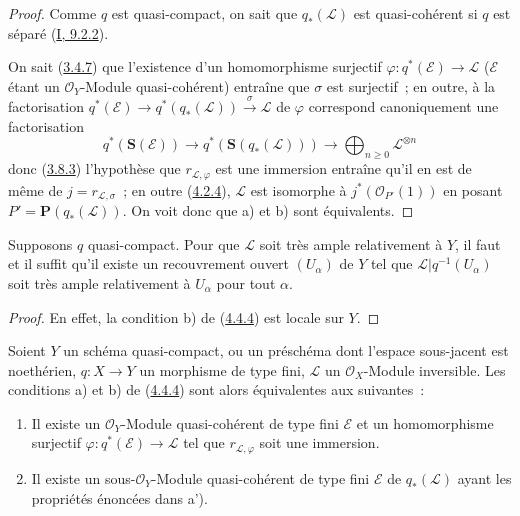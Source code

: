 \begin{proof}
Comme $q$ est quasi-compact, on sait que $q_*(\mathcal{L})$ est quasi-cohérent
si $q$ est séparé (\hyperref[I.9.2.2-fr]{I, 9.2.2}).


On sait (\hyperref[II.3.4.7-fr]{3.4.7}) que l'existence d'un homomorphisme
surjectif $\varphi:q^*(\mathcal{E})\to\mathcal{L}$ ($\mathcal{E}$ étant un
$\mathcal{O}_Y$-Module quasi-cohérent) entraîne que $\sigma$ est surjectif~;
en outre, à la factorisation
$q^*(\mathcal{E})\to q^*(q_*(\mathcal{L}))\xrightarrow{\sigma}\mathcal{L}$
de $\varphi$ correspond canoniquement une factorisation
\[
  q^*(\mathbf{S}(\mathcal{E}))
    \longrightarrow q^*(\mathbf{S}(q_*(\mathcal{L})))
    \longrightarrow\bigoplus_{n\geq0}\mathcal{L}^{\otimes n}
\]
donc (\hyperref[II.3.8.3-fr]{3.8.3}) l'hypothèse que
$r_{\mathcal{L},\varphi}$ est une immersion entraîne qu'il en est de même de
$j=r_{\mathcal{L},\sigma}$~; en outre
(\hyperref[II.4.2.4-fr]{4.2.4}), $\mathcal{L}$ est isomorphe à
$j^*(\mathcal{O}_{P'}(1))$ en posant
$P'=\mathbf{P}(q_*(\mathcal{L}))$. On voit donc que a) et b) sont
équivalents.
\end{proof}

\begin{corollary}[4.4.5]
\label{II.4.4.5-fr}
Supposons $q$ quasi-compact. Pour que $\mathcal{L}$ soit très ample
relativement à $Y$, il faut et il suffit qu'il existe un recouvrement ouvert
$(U_\alpha)$ de $Y$ tel que
$\mathcal{L}|q^{-1}(U_\alpha)$ soit très ample relativement à $U_\alpha$ pour
tout $\alpha$.
\end{corollary}

\begin{proof}
En effet, la condition b) de (\hyperref[II.4.4.4-fr]{4.4.4}) est locale sur
$Y$.
\end{proof}

\begin{proposition}[4.4.6]
\label{II.4.4.6-fr}
Soient $Y$ un schéma quasi-compact, ou un préschéma dont l'espace sous-jacent
est noethérien, $q:X\to Y$ un morphisme de type fini, $\mathcal{L}$ un
$\mathcal{O}_X$-Module inversible. Les conditions a) et b) de
(\hyperref[II.4.4.4-fr]{4.4.4}) sont alors équivalentes aux suivantes~:
\begin{enumerate}
  \item[\rm{a')}] Il existe un $\mathcal{O}_Y$-Module quasi-cohérent de type
  fini $\mathcal{E}$ et un homomorphisme surjectif
  $\varphi:q^*(\mathcal{E})\to\mathcal{L}$ tel que
  $r_{\mathcal{L},\varphi}$ soit une immersion.
  \item[\rm{b')}] Il existe un sous-$\mathcal{O}_Y$-Module quasi-cohérent de type
  fini $\mathcal{E}$ de $q_*(\mathcal{L})$ ayant les propriétés énoncées dans
  a').
\end{enumerate}
\end{proposition}

